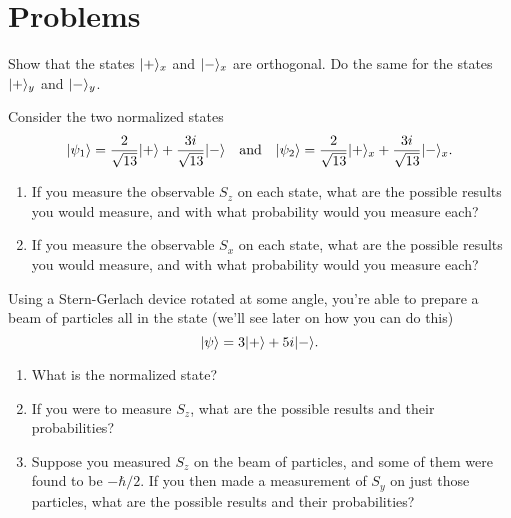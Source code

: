 \section*{Problems}
%

\begin{problem}[Orthogonality]
Show that the states $| + \rangle_x$ and $| - \rangle_x$ are orthogonal.  Do the same for the states $| + \rangle_y$ and $| - \rangle_y$. 
\end{problem}

\begin{problem}
Consider the two normalized states 
\[
| \psi_1 \rangle = \frac{2}{\sqrt{13}} | + \rangle + \frac{3i}{\sqrt{13}} | - \rangle \quad \text{and} \quad | \psi_2 \rangle = \frac{2}{\sqrt{13}} | + \rangle_x + \frac{3i}{\sqrt{13}} | - \rangle_x.
\]
\begin{enumerate}[label=(\alph*)]
\item If you measure the observable $S_z$ on each state, what are the possible results you would measure, and with what probability would you measure each?
\item If you measure the observable $S_x$ on each state, what are the possible results you would measure, and with what probability would you measure each?
\end{enumerate}
\end{problem}

\begin{problem}[Measurements]
Using a Stern-Gerlach device rotated at some angle, you're able to prepare a beam of particles all in the state  (we'll see later on how you can do this)
\[
| \psi \rangle = 3 | + \rangle + 5i | - \rangle.
\]
\begin{enumerate}[label=(\alph*)]
\item What is the normalized state?
\item If you were to measure $S_z$, what are the possible results and their probabilities?
\item Suppose you measured $S_z$ on the beam of particles, and some of them were found to be $-\hbar/2$.  If you then made a measurement of $S_y$ on just those particles, what are the possible results and their probabilities? 
\end{enumerate}
\end{problem}

